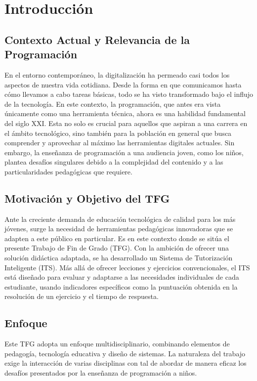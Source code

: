 \chapter{Introducción} \label{chap:introduction}

\section{Contexto Actual y Relevancia de la Programación}
En el entorno contemporáneo, la digitalización ha permeado casi todos los aspectos de nuestra vida cotidiana. Desde la forma en que comunicamos hasta cómo llevamos a cabo tareas básicas, todo se ha visto transformado bajo el influjo de la tecnología. En este contexto, la programación, que antes era vista únicamente como una herramienta técnica, ahora es una habilidad fundamental del siglo XXI. Esta no solo es crucial para aquellos que aspiran a una carrera en el ámbito tecnológico, sino también para la población en general que busca comprender y aprovechar al máximo las herramientas digitales actuales. Sin embargo, la enseñanza de programación a una audiencia joven, como los niños, plantea desafíos singulares debido a la complejidad del contenido y a las particularidades pedagógicas que requiere.

\section{Motivación y Objetivo del TFG}
Ante la creciente demanda de educación tecnológica de calidad para los más jóvenes, surge la necesidad de herramientas pedagógicas innovadoras que se adapten a este público en particular. Es en este contexto donde se sitúa el presente Trabajo de Fin de Grado (TFG). Con la ambición de ofrecer una solución didáctica adaptada, se ha desarrollado un Sistema de Tutorización Inteligente (ITS). Más allá de ofrecer lecciones y ejercicios convencionales, el ITS está diseñado para evaluar y adaptarse a las necesidades individuales de cada estudiante, usando indicadores específicos como la puntuación obtenida en la resolución de un ejercicio y el tiempo de respuesta.

\section{Enfoque}
Este TFG adopta un enfoque multidisciplinario, combinando elementos de pedagogía, tecnología educativa y diseño de sistemas. La naturaleza del trabajo exige la interacción de varias disciplinas con tal de abordar de manera eficaz los desafíos presentados por la enseñanza de programación a niños.

